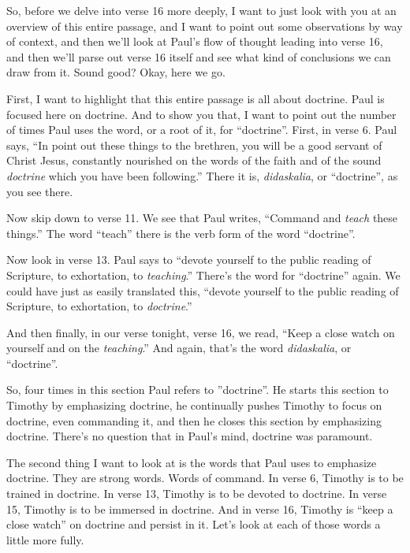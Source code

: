 \documentclass[letterpaper, 12pt]{article}
\begin{document}
    So, before we delve into verse 16 more deeply, I want to just look
    with you at an overview of this entire passage, and I want to point
    out some observations by way of context, and then we'll look at
    Paul's flow of thought leading into verse 16, and then we'll parse
    out verse 16 itself and see what kind of conclusions we can draw
    from it. Sound good? Okay, here we go.

    First, I want to highlight that this entire passage is all about
    doctrine. Paul is focused here on doctrine. And to show you that, I
    want to point out the number of times Paul uses the word, or a root
    of it, for ``doctrine''. First, in verse 6. Paul says, ``In point
    out these things to the brethren, you will be a good servant of
    Christ Jesus, constantly nourished on the words of the faith and of
    the sound \emph{doctrine} which you have been following.'' There it
    is, \emph{didaskalia}, or ``doctrine'', as you see there.

    Now skip down to verse 11. We see that Paul writes, ``Command and
    \emph{teach} these things.'' The word ``teach'' there is the verb
    form of the word ``doctrine''. 

    Now look in verse 13. Paul says to ``devote yourself to the public
    reading of Scripture, to exhortation, to \emph{teaching}.'' There's
    the word for ``doctrine'' again. We could have just as easily
    translated this, ``devote yourself to the public reading of
    Scripture, to exhortation, to \emph{doctrine}.''

    And then finally, in our verse tonight, verse 16, we read, ``Keep a
    close watch on yourself and on the \emph{teaching}.'' And again,
    that's the word \emph{didaskalia}, or ``doctrine''. 

    So, four times in this section Paul refers to ''doctrine''. He
    starts this section to Timothy by emphasizing doctrine, he
    continually pushes Timothy to focus on doctrine, even commanding it,
    and then he closes this section by emphasizing doctrine. There's no
    question that in Paul's mind, doctrine was paramount.

    The second thing I want to look at is the words that Paul uses to
    emphasize doctrine. They are strong words. Words of command. In
    verse 6, Timothy is to be trained in doctrine. In verse 13, Timothy
    is to be devoted to doctrine. In verse 15, Timothy is to be immersed
    in doctrine. And in verse 16, Timothy is ``keep a close watch'' on
    doctrine and persist in it.  Let's look at each of those words a
    little more fully.
\end{document}
